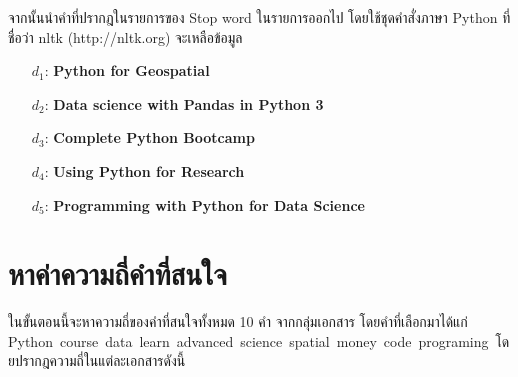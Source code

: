 \documentclass[11pt,a4paper]{article}
\newcommand{\fir}{Python}
\newcommand{\seco}{course}
\newcommand{\thi}{data}
\newcommand{\fou}{learn}
\newcommand{\fif}{advanced}
\newcommand{\six}{science}
\newcommand{\sev}{spatial}
\newcommand{\eig}{money}
\newcommand{\nin}{code}
\newcommand{\ten}{programing}
\begin{document}
    จากนั้นนำคำที่ปรากฎในรายการของ Stop word ในรายการออกไป โดยใช้ชุดคำสั่งภาษา Python ที่ชื่อว่า nltk (http://nltk.org) จะเหลือข้อมูล
    
    \begin{itemize}
        \item[$d_1$:] {\bf Python for Geospatial}  \\
            

        \item[$d_2$:] {\bf Data science with Pandas in Python 3}  \\
            

        \item[$d_3$:] {\bf Complete Python Bootcamp} \\
            

        \item[$d_4$:] {\bf Using Python for Research} \\
            

        \item[$d_5$:] {\bf Programming with Python for Data Science} \\
            
    \end{itemize}

    \section{หาค่าความถี่คำที่สนใจ}
    ในขั้นตอนนี้จะหาความถี่ของคำที่สนใจทั้งหมด 10 คำ จากกลุ่มเอกสาร โดยคำที่เลือกมาได้แก่ \fir\ \seco\ \thi\ \fou\ \fif\ \six\ \sev\ \eig\ \nin\ \ten\ โดยปรากฎความถี่ในแต่ละเอกสารดังนี้
\end{document}
